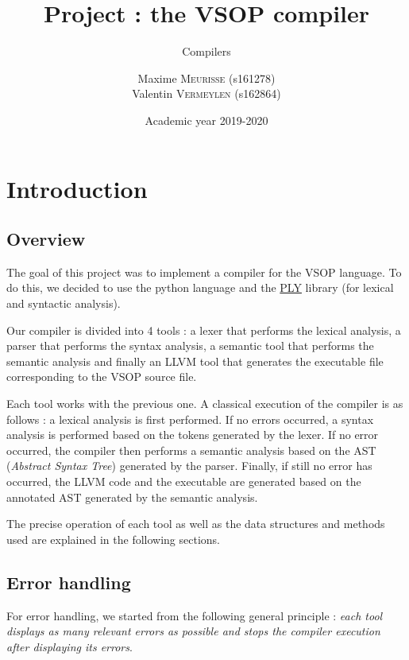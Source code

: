 \documentclass[a4paper, 12pt]{article}
\institute{University of Liège}
\title{Project : the VSOP compiler}
\subtitle{Compilers}
\author{
    Maxime \textsc{Meurisse} (s161278)\\
    Valentin \textsc{Vermeylen} (s162864)\\
}
\date{Academic year 2019-2020}
\begin{document}
    
    \maketitle
    
    
    \section{Introduction}
    
    \subsection{Overview}
    
    The goal of this project was to implement a compiler for the VSOP language. To do this, we decided to use the python language and the \href{https://www.dabeaz.com/ply/}{PLY} library (for lexical and syntactic analysis).
    
    Our compiler is divided into 4 tools : a lexer that performs the lexical analysis, a parser that performs the syntax analysis, a semantic tool that performs the semantic analysis and finally an LLVM tool that generates the executable file corresponding to the VSOP source file.
    
    Each tool works with the previous one. A classical execution of the compiler is as follows : a lexical analysis is first performed. If no errors occurred, a syntax analysis is performed based on the tokens generated by the lexer. If no error occurred, the compiler then performs a semantic analysis based on the AST (\emph{Abstract Syntax Tree}) generated by the parser. Finally, if still no error has occurred, the LLVM code and the executable are generated based on the annotated AST generated by the semantic analysis.
    
    The precise operation of each tool as well as the data structures and methods used are explained in the following sections.
    
    \subsection{Error handling}
    
    For error handling, we started from the following general principle : {\it each tool displays as many relevant errors as possible and stops the compiler execution after displaying its errors}.
    
\end{document}
